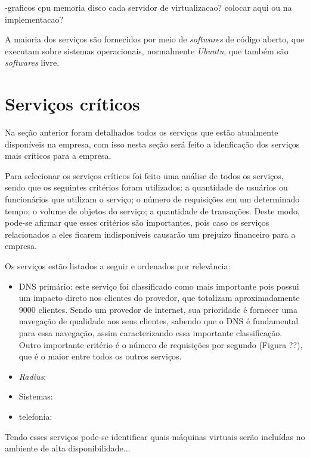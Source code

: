 -graficos cpu memoria disco cada servidor de virtualizacao? colocar aqui ou na implementacao?

A maioria dos serviços são fornecidos por meio de \textit{softwares} de código aberto, que executam sobre sistemas operacionais, normalmente 
\textit{Ubuntu}, que também são \textit{softwares} livre.

\section{Serviços críticos}
\label{section:servcrit}

Na seção anterior foram detalhados todos os serviços que estão atualmente disponíveis na empresa, com isso nesta seção será feito a idenficação
dos serviços mais críticos para a empresa.

Para selecionar os serviços críticos foi feito uma análise de todos os serviços, sendo que os seguintes critérios foram utilizados: 
a quantidade de usuários ou funcionários que utilizam o serviço; 
o número de requisições em um determinado tempo;
o volume de objetos do serviço;
a quantidade de transações.
Deste modo, pode-se afirmar que esses critérios são importantes, pois caso os serviços relacionados a eles ficarem indisponíveis causarão 
um prejuízo financeiro para a empresa. 

Os serviços estão listados a seguir e ordenados por relevância:
\begin{itemize}
 \item \ac{DNS} primário: este serviço foi classificado como mais importante pois possui um impacto direto nos clientes do provedor, que 
 totalizam aproximadamente 9000 clientes. Sendo um provedor de internet, sua prioridade é fornecer uma navegação de qualidade aos seus clientes, 
 sabendo que o \ac{DNS} é fundamental para essa navegação, assim caracterizando essa importante classificação. Outro importante critério é
 o número de requisições por segundo (Figura ??), que é o maior entre todos os outros serviços.
 \item \textit{Radius}: 
 \item Sistemas: 
 \item telefonia: 
\end{itemize}

Tendo esses serviços pode-se identificar quais máquinas virtuais serão incluídas no ambiente de alta disponibilidade...


